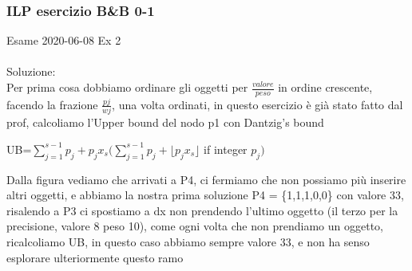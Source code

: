 \documentclass{article}
\begin{document}
\subsubsection{ILP esercizio B\&B 0-1}
Esame 2020-06-08 Ex 2\\
\noindent{}
\\
Soluzione:\\
Per prima cosa dobbiamo ordinare gli oggetti per $ \frac{valore}{peso} $ in ordine crescente, facendo la frazione $ \frac{pj}{wj} $, una volta ordinati, in questo esercizio è già stato fatto dal prof, calcoliamo l'Upper bound del nodo p1 con Dantzig's bound\\
\begin{center}
UB=$ \displaystyle \sum_{j=1}^{s-1} p_j + p_jx_s (\displaystyle \sum_{j=1}^{s-1} p_j + \lfloor p_j x_s \rfloor$ if integer $p_j)  $
\end{center}

\begin{center}
\end{center}

Dalla figura vediamo che arrivati a P4, ci fermiamo che non possiamo più inserire altri oggetti, e abbiamo la nostra prima soluzione P4 = \{1,1,1,0,0\} con valore 33, risalendo a P3 ci spostiamo a dx non prendendo l'ultimo oggetto (il terzo per la precisione, valore 8 peso 10), come ogni volta che non prendiamo un oggetto, ricalcoliamo UB, in questo caso abbiamo sempre valore 33, e non ha senso esplorare ulteriormente questo ramo
\end{document}
